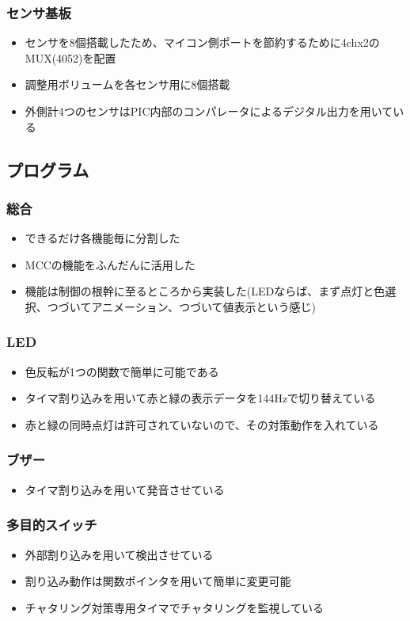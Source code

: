 \documentclass[a4paper]{ltjsarticle}
\begin{document}
\subsubsection{センサ基板}
\begin{itemize}
  \item センサを8個搭載したため、マイコン側ポートを節約するために4chx2のMUX(4052)を配置
  \item 調整用ボリュームを各センサ用に8個搭載
  \item 外側計4つのセンサはPIC内部のコンパレータによるデジタル出力を用いている
\end{itemize}
\subsection{プログラム}
\subsubsection{総合}
\begin{itemize}
  \item できるだけ各機能毎に分割した
  \item MCCの機能をふんだんに活用した
  \item 機能は制御の根幹に至るところから実装した(LEDならば、まず点灯と色選択、つづいてアニメーション、つづいて値表示という感じ)
\end{itemize}
\subsubsection{LED}
\begin{itemize}
  \item 色反転が1つの関数で簡単に可能である
  \item タイマ割り込みを用いて赤と緑の表示データを144Hzで切り替えている
  \item 赤と緑の同時点灯は許可されていない\cite{ds:led}ので、その対策動作を入れている
\end{itemize}
\subsubsection{ブザー}
\begin{itemize}
  \item タイマ割り込みを用いて発音させている
\end{itemize}
\subsubsection{多目的スイッチ}
\begin{itemize}
  \item 外部割り込みを用いて検出させている
  \item 割り込み動作は関数ポインタを用いて簡単に変更可能
  \item チャタリング対策専用タイマでチャタリングを監視している
\end{itemize}
\end{document}
